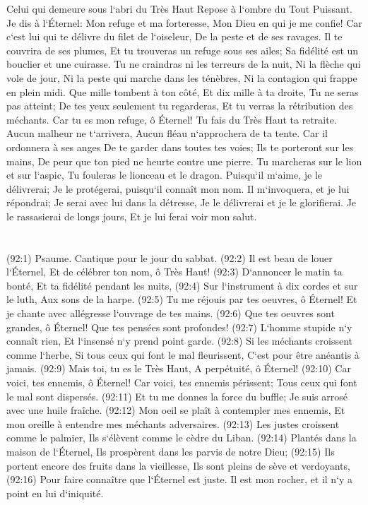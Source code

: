 \verse Celui qui demeure sous l`abri du Très Haut Repose à l`ombre du Tout Puissant. 
\verse Je dis à l`Éternel: Mon refuge et ma forteresse, Mon Dieu en qui je me confie! 
\verse Car c`est lui qui te délivre du filet de l`oiseleur, De la peste et de ses ravages. 
\verse Il te couvrira de ses plumes, Et tu trouveras un refuge sous ses ailes; Sa fidélité est un bouclier et une cuirasse. 
\verse Tu ne craindras ni les terreurs de la nuit, Ni la flèche qui vole de jour, 
\verse Ni la peste qui marche dans les ténèbres, Ni la contagion qui frappe en plein midi. 
\verse Que mille tombent à ton côté, Et dix mille à ta droite, Tu ne seras pas atteint; 
\verse De tes yeux seulement tu regarderas, Et tu verras la rétribution des méchants. 
\verse Car tu es mon refuge, ô Éternel! Tu fais du Très Haut ta retraite. 
\verse Aucun malheur ne t`arrivera, Aucun fléau n`approchera de ta tente. 
\verse Car il ordonnera à ses anges De te garder dans toutes tes voies; 
\verse Ils te porteront sur les mains, De peur que ton pied ne heurte contre une pierre. 
\verse Tu marcheras sur le lion et sur l`aspic, Tu fouleras le lionceau et le dragon. 
\verse Puisqu`il m`aime, je le délivrerai; Je le protégerai, puisqu`il connaît mon nom. 
\verse Il m`invoquera, et je lui répondrai; Je serai avec lui dans la détresse, Je le délivrerai et je le glorifierai. 
\verse Je le rassasierai de longs jours, Et je lui ferai voir mon salut. 

\chapter{}

\verse (92:1) Psaume. Cantique pour le jour du sabbat. (92:2) Il est beau de louer l`Éternel, Et de célébrer ton nom, ô Très Haut! 
\verse (92:3) D`annoncer le matin ta bonté, Et ta fidélité pendant les nuits, 
\verse (92:4) Sur l`instrument à dix cordes et sur le luth, Aux sons de la harpe. 
\verse (92:5) Tu me réjouis par tes oeuvres, ô Éternel! Et je chante avec allégresse l`ouvrage de tes mains. 
\verse (92:6) Que tes oeuvres sont grandes, ô Éternel! Que tes pensées sont profondes! 
\verse (92:7) L`homme stupide n`y connaît rien, Et l`insensé n`y prend point garde. 
\verse (92:8) Si les méchants croissent comme l`herbe, Si tous ceux qui font le mal fleurissent, C`est pour être anéantis à jamais. 
\verse (92:9) Mais toi, tu es le Très Haut, A perpétuité, ô Éternel! 
\verse (92:10) Car voici, tes ennemis, ô Éternel! Car voici, tes ennemis périssent; Tous ceux qui font le mal sont dispersés. 
\verse (92:11) Et tu me donnes la force du buffle; Je suis arrosé avec une huile fraîche. 
\verse (92:12) Mon oeil se plaît à contempler mes ennemis, Et mon oreille à entendre mes méchants adversaires. 
\verse (92:13) Les justes croissent comme le palmier, Ils s`élèvent comme le cèdre du Liban. 
\verse (92:14) Plantés dans la maison de l`Éternel, Ils prospèrent dans les parvis de notre Dieu; 
\verse (92:15) Ils portent encore des fruits dans la vieillesse, Ils sont pleins de sève et verdoyants, 
\verse (92:16) Pour faire connaître que l`Éternel est juste. Il est mon rocher, et il n`y a point en lui d`iniquité. 

